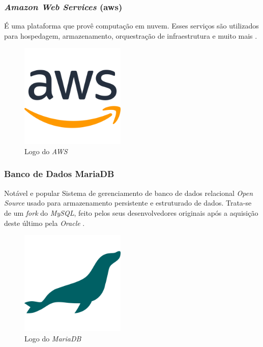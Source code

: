 \subsubsection{\emph{Amazon Web Services} (\gls{aws})} 
É uma plataforma que provê computação em nuvem. Esses serviços são utilizados para hospedagem, armazenamento, orquestração de infraestrutura e muito mais \cite{aws}.

\begin{figure}[htb]
	\centering
	\includegraphics[width=5cm]{cap04-desenvolvimento/images/4-4-3-2-aws-logo.png}
	\caption{Logo do \emph{AWS}}
	\label{fig:aws-logo}
\end{figure}
\FloatBarrier

\subsubsection{Banco de Dados MariaDB}
Notável e popular Sistema de gerenciamento de banco de dados relacional \emph{Open Source} usado para armazenamento persistente e estruturado de dados. Trata-se de um \emph{fork} do \emph{MySQL}, feito pelos seus desenvolvedores originais após a aquisição deste último pela \emph{Oracle} \cite{mariadb}.

\begin{figure}[htb]
	\centering
	\includegraphics[width=5cm]{cap04-desenvolvimento/images/4-4-3-3-mariadb-logo.png}
	\caption{Logo do \emph{MariaDB}}
	\label{fig:mariadb-logo}
\end{figure}
\FloatBarrier

